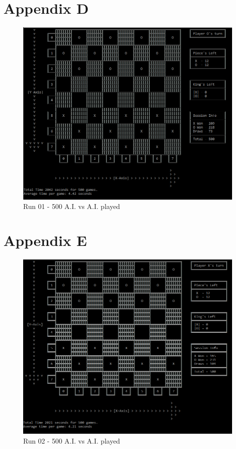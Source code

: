 \documentclass[10pt, a4paper]{article}
\begin{document}
 \section{Appendix D}
  \label{appendix:d}
 \begin{figure}[H]
 	\centering	
 	\includegraphics[scale=0.8]{RunOne500}
 	\caption{Run 01 - 500 A.I. vs A.I. played}		
 \end{figure}
 \newpage
 \section{Appendix E}
  \label{appendix:e}
 \begin{figure}[H]
 	\centering
 	\includegraphics[scale=0.8]{RunTwo500}
 	\caption{Run 02 - 500 A.I. vs A.I. played}
 \end{figure}
 \newpage
\end{document}
